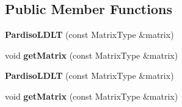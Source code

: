 \subsection*{Public Member Functions}
\begin{DoxyCompactItemize}
\item 
\mbox{\label{class_eigen_1_1_pardiso_l_d_l_t_a6305c6f32af14b1e956185ec38ae5fbe}} 
{\bfseries Pardiso\+L\+D\+LT} (const Matrix\+Type \&matrix)
\item 
\mbox{\label{class_eigen_1_1_pardiso_l_d_l_t_ac9934f8e3bf712157ca2639a5fa63f50}} 
void {\bfseries get\+Matrix} (const Matrix\+Type \&matrix)
\item 
\mbox{\label{class_eigen_1_1_pardiso_l_d_l_t_a6305c6f32af14b1e956185ec38ae5fbe}} 
{\bfseries Pardiso\+L\+D\+LT} (const Matrix\+Type \&matrix)
\item 
\mbox{\label{class_eigen_1_1_pardiso_l_d_l_t_ac9934f8e3bf712157ca2639a5fa63f50}} 
void {\bfseries get\+Matrix} (const Matrix\+Type \&matrix)
\end{DoxyCompactItemize}
